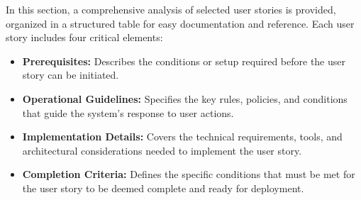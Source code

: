 In this section, a comprehensive analysis of selected user stories is provided, organized in a structured table for easy documentation and reference. Each user story includes four critical elements:
\begin{itemize}
    \item \textbf{Prerequisites:} Describes the conditions or setup required before the user story can be initiated.
    \item \textbf{Operational Guidelines:} Specifies the key rules, policies, and conditions that guide the system's response to user actions.
    \item \textbf{Implementation Details:} Covers the technical requirements, tools, and architectural considerations needed to implement the user story.
    \item \textbf{Completion Criteria:} Defines the specific conditions that must be met for the user story to be deemed complete and ready for deployment.
\end{itemize}

